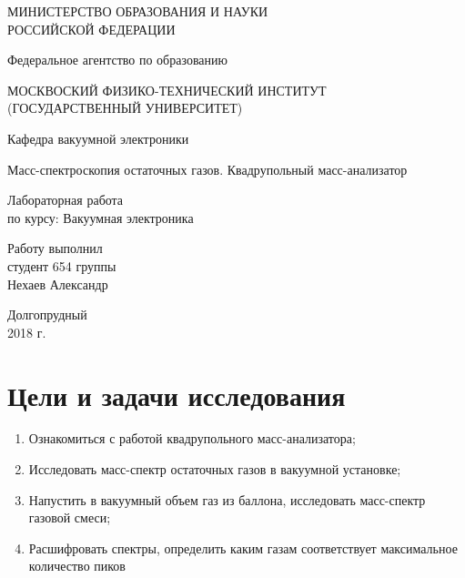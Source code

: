 \documentclass[a4paper, 12pt]{article}
\begin{document}
	\begin{titlepage}
	\begin{center}
		\large{МИНИСТЕРСТВО ОБРАЗОВАНИЯ И НАУКИ\\РОССИЙСКОЙ ФЕДЕРАЦИИ}
		
		Федеральное агентство по образованию
		\vspace{0.5cm}
		
		\large{МОСКВОСКИЙ ФИЗИКО-ТЕХНИЧЕСКИЙ ИНСТИТУТ\\(ГОСУДАРСТВЕННЫЙ УНИВЕРСИТЕТ)}
		\vspace{0.5cm}
		
		Кафедра вакуумной электроники
		\vfill
		
		{\LARGE Масс-спектроскопия остаточных газов. Квадрупольный масс-анализатор}
		\bigskip
		
		Лабораторная работа\\
		по курсу: Вакуумная электроника 
	\end{center}
	\vfill
	
	\hfill\begin{minipage}{0.4\textwidth}
		Работу выполнил\\
		студент 654 группы\\
		Нехаев Александр
	\end{minipage}
	\vfill
	
	\begin{center}
		Долгопрудный\\2018 г.
	\end{center}
	\end{titlepage}
	\tableofcontents
	\newpage
	\section{Цели и задачи исследования}
	\begin{enumerate}
		\item Ознакомиться с работой квадрупольного масс-анализатора;
		\item Исследовать масс-спектр остаточных газов в вакуумной установке;
		\item Напустить в вакуумный объем газ из баллона, исследовать масс-спектр газовой смеси;
		\item Расшифровать спектры, определить каким газам соответствует максимальное количество пиков
	\end{enumerate}
\end{document}
